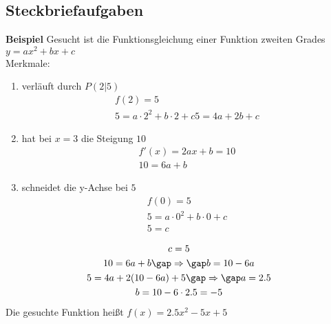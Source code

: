 \subsection{Steckbriefaufgaben}
\textbf{Beispiel} Gesucht ist die Funktionsgleichung einer Funktion zweiten Grades \\
$y = ax^2 + bx + c$ \\
Merkmale:
\begin{enumerate}
  \item verläuft durch $P(2|5)$
  \begin{gather*}
    f(2) = 5 \\
    5 = a \cdot 2^2 + b \cdot 2 + c
    5 = 4a + 2b + c
  \end{gather*}
  \item hat bei $x=3$ die Steigung $10$
  \begin{gather*}
    f'(x) = 2ax + b = 10 \\
    10 = 6a + b
  \end{gather*}
  \item schneidet die y-Achse bei $5$
  \begin{gather*}
    f(0) = 5 \\
    5 = a \cdot 0^2 + b \cdot 0 + c \\
    5 = c
  \end{gather*}
\end{enumerate}
\begin{gather*}
  c = 5 \\
  10 = 6a + b \gap\Rightarrow\gap b = 10 - 6a \\
  5 = 4a + 2(10 - 6a) + 5 \gap\Rightarrow\gap a = 2.5 \\
  b = 10 - 6 \cdot 2.5 = -5
\end{gather*}
Die gesuchte Funktion heißt $f(x) = 2.5x^2 -5x + 5$ \\\\
